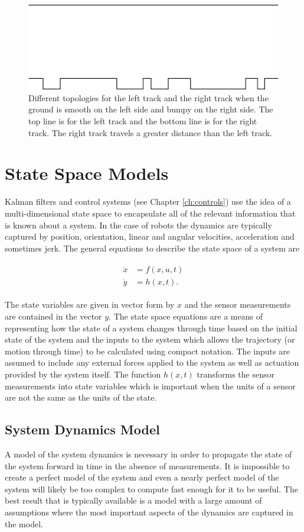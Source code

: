 \begin{figure}[ht!]
	\centering
	\includegraphics[width=.5\textwidth]{images/topography}
	\caption{Different topologies for the left track and the right track when the ground is smooth on the left side and bumpy on the right side. The top line is for the left track and the bottom line is for the right track. The right track travels a greater distance than the left track.}
	\label{fig:topology}
\end{figure}

\section{State Space Models}
\label{sec:statespacemodels}
Kalman filters and control systems (see Chapter \ref{ch:controls}) use the idea of a multi-dimensional state space to encapsulate all of the relevant information that is known about a system. In the case of robots the dynamics are typically captured by position, orientation, linear and angular velocities, acceleration and sometimes jerk. The general equations to describe the state space of a system are

\begin{align}
\label{eq:statespace}
\begin{split}
\dot{x} &= f(x,u,t) \\
\dot{y} &= h(x,t).
\end{split}
\end{align}

The state variables are given in vector form by $x$ and the sensor measurements are contained in the vector $y$. The state space equations are a means of representing how the state of a system changes through time based on the initial state of the system and the inputs to the system which allows the trajectory (or motion through time) to be calculated using compact notation. The inputs are assumed to include any external forces applied to the system as well as actuation provided by the system itself. The function $h(x,t)$ transforms the sensor measurements into state variables which is important when the units of a sensor are not the same as the units of the state.

\subsection{System Dynamics Model}
\label{sec:dynamics}
A model of the system dynamics is necessary in order to propagate the state of the system forward in time in the absence of measurements. It is impossible to create a perfect model of the system and even a nearly perfect model of the system will likely be too complex to compute fast enough for it to be useful. The best result that is typically available is a model with a large amount of assumptions where the most important aspects of the dynamics are captured in the model.

